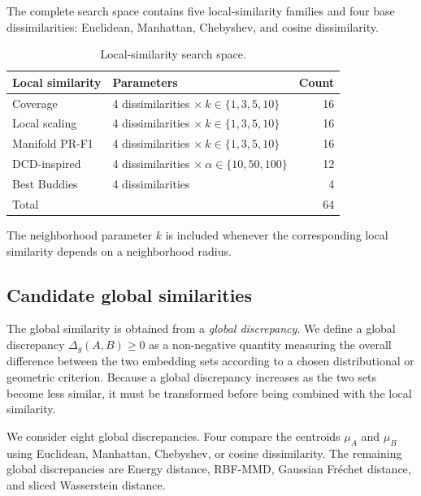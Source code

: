 \documentclass[preprint,12pt]{elsarticle}
\begin{document}
The complete search space contains five local-similarity families and four
base dissimilarities: Euclidean, Manhattan, Chebyshev, and cosine
dissimilarity.

\begin{table}[!htbp]
\centering
\caption{Local-similarity search space.}
\label{tab:local-search-space}
\small
\begin{tabularx}{\linewidth}{lXr}
\toprule
Local similarity & Parameters & Count\\
\midrule
Coverage
& 4 dissimilarities $\times\ k\in\{1,3,5,10\}$
& 16\\
Local scaling
& 4 dissimilarities $\times\ k\in\{1,3,5,10\}$
& 16\\
Manifold PR-F1
& 4 dissimilarities $\times\ k\in\{1,3,5,10\}$
& 16\\
DCD-inspired
& 4 dissimilarities $\times\ \alpha\in\{10,50,100\}$
& 12\\
Best Buddies
& 4 dissimilarities
& 4\\
\midrule
Total & & 64\\
\bottomrule
\end{tabularx}
\end{table}

The neighborhood parameter $k$ is included whenever the corresponding local
similarity depends on a neighborhood radius.

\subsection{Candidate global similarities}

The global similarity is obtained from a \emph{global discrepancy}. We define
a global discrepancy $\Delta_g(A,B)\geq0$ as a non-negative quantity measuring
the overall difference between the two embedding sets according to a chosen
distributional or geometric criterion. Because a global discrepancy increases
as the two sets become less similar, it must be transformed before being
combined with the local similarity.

We consider eight global discrepancies. Four compare the centroids
$\mu_A$ and $\mu_B$ using Euclidean, Manhattan, Chebyshev, or cosine
dissimilarity. The remaining global discrepancies are Energy distance,
RBF-MMD, Gaussian Fr\'echet distance, and sliced Wasserstein distance.
\end{document}
